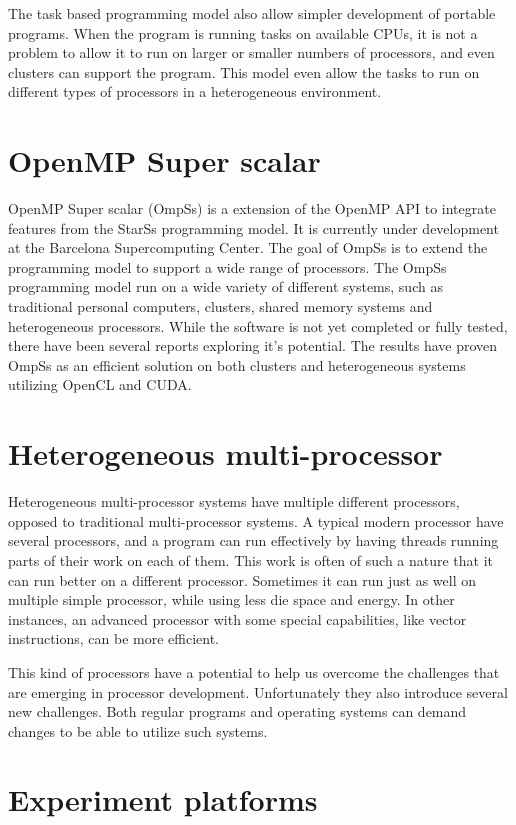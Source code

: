 The task based programming model also allow simpler development of portable programs.
When the program is running tasks on available CPUs, it is not a problem to allow it to run on larger or smaller numbers of processors, and even clusters can support the program.
This model even allow the tasks to run on different types of processors in a heterogeneous environment.

\section[OmpSs]{OpenMP Super scalar}
OpenMP Super scalar (OmpSs) is a extension of the OpenMP API to integrate features from the StarSs programming model.
It is currently under development at the Barcelona Supercomputing Center.
The goal of OmpSs is to extend the programming model to support a wide range of processors.
The OmpSs programming model run on a wide variety of different systems, such as traditional personal computers, clusters, shared memory systems and heterogeneous processors.
While the software is not yet completed or fully tested, there have been several reports exploring it's potential.
The results have proven OmpSs as an efficient solution on both clusters and heterogeneous systems utilizing OpenCL and CUDA.


\section{Heterogeneous multi-processor}
Heterogeneous multi-processor systems have multiple different processors, opposed to traditional multi-processor systems.
A typical modern processor have several processors, and a program can run effectively by having threads running parts of their work on each of them.
This work is often of such a nature that it can run better on a different processor.
Sometimes it can run just as well on multiple simple processor, while using less die space and energy.
In other instances, an advanced processor with some special capabilities, like vector instructions, can be more efficient.

This kind of processors have a potential to help us overcome the challenges that are emerging in processor development.
Unfortunately they also introduce several new challenges.
Both regular programs and operating systems can demand changes to be able to utilize such systems.

\section{Experiment platforms}

